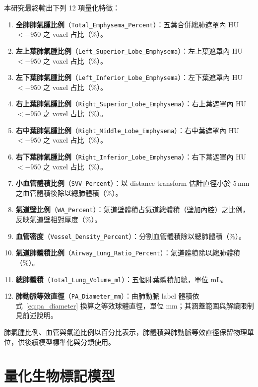\begin{ZhChapter}
本研究最終輸出下列 12 項量化特徵：

\begin{enumerate}
    \item \textbf{全肺肺氣腫比例}（\texttt{Total\_Emphysema\_Percent}）：五葉合併總肺遮罩內 HU $< -950$ 之 voxel 占比（\%）。
    \item \textbf{左上葉肺氣腫比例}（\texttt{Left\_Superior\_Lobe\_Emphysema}）：左上葉遮罩內 HU $< -950$ 之 voxel 占比（\%）。
    \item \textbf{左下葉肺氣腫比例}（\texttt{Left\_Inferior\_Lobe\_Emphysema}）：左下葉遮罩內 HU $< -950$ 之 voxel 占比（\%）。
    \item \textbf{右上葉肺氣腫比例}（\texttt{Right\_Superior\_Lobe\_Emphysema}）：右上葉遮罩內 HU $< -950$ 之 voxel 占比（\%）。
    \item \textbf{右中葉肺氣腫比例}（\texttt{Right\_Middle\_Lobe\_Emphysema}）：右中葉遮罩內 HU $< -950$ 之 voxel 占比（\%）。
    \item \textbf{右下葉肺氣腫比例}（\texttt{Right\_Inferior\_Lobe\_Emphysema}）：右下葉遮罩內 HU $< -950$ 之 voxel 占比（\%）。
    \item \textbf{小血管體積比例}（\texttt{SVV\_Percent}）：以 distance transform 估計直徑小於 5\,mm 之血管體積後除以總肺體積（\%）。
    \item \textbf{氣道壁比例}（\texttt{WA\_Percent}）：氣道壁體積占氣道總體積（壁加內腔）之比例，反映氣道壁相對厚度（\%）。
    \item \textbf{血管密度}（\texttt{Vessel\_Density\_Percent}）：分割血管體積除以總肺體積（\%）。
    \item \textbf{氣道肺體積比例}（\texttt{Airway\_Lung\_Ratio\_Percent}）：氣道體積除以總肺體積（\%）。
    \item \textbf{總肺體積}（\texttt{Total\_Lung\_Volume\_ml}）：五個肺葉體積加總，單位 mL。
    \item \textbf{肺動脈等效直徑}（\texttt{PA\_Diameter\_mm}）：由肺動脈 label 體積依式~\eqref{eq:pa_diameter} 換算之等效球體直徑，單位 mm；其涵蓋範圍與解讀限制見前述說明。
\end{enumerate}

肺氣腫比例、血管與氣道比例以百分比表示，肺體積與肺動脈等效直徑保留物理單位，供後續模型標準化與分類使用。

\clearpage
\section{量化生物標記模型}\label{sec:quant_cls}


\end{ZhChapter}
